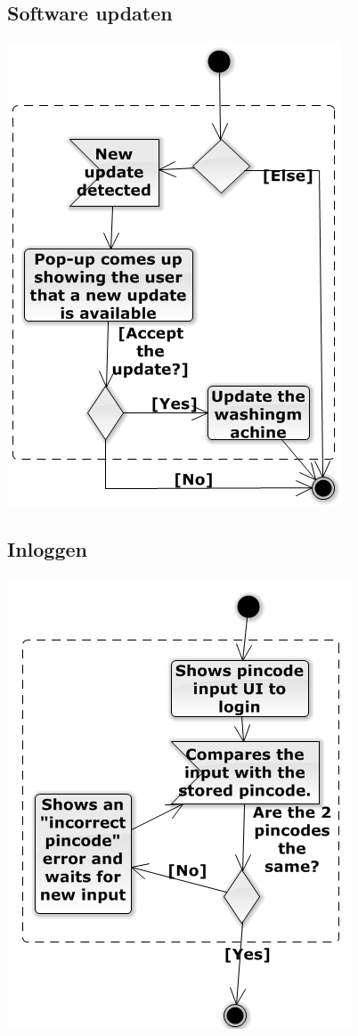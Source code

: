 \subsection{Software updaten}
\includegraphics{updateActivity.png}

\subsection{Inloggen}
\includegraphics{loginActivity.png}